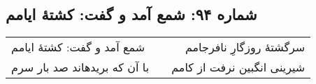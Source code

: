 \begin{center}
\section*{شماره ۹۴: شمع آمد و گفت: کشتۀ ایامم}
\label{sec:094}
\begin{longtable}{l p{0.5cm} r}
شمع آمد و گفت: کشتهٔ ایامم
&&
سرگشتهٔ روزگارِ نافرجامم
\\
با آن که بریدهاند صد بار سرم
&&
شیرینی انگبین نرفت از کامم
\\
\end{longtable}
\end{center}
